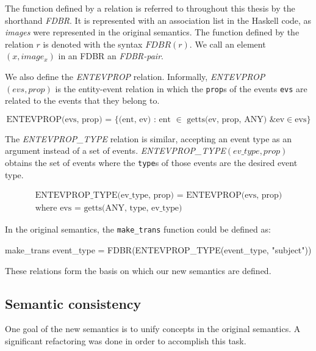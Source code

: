 \documentclass[../main.tex]{subfiles}
\begin{document}
The function defined by a relation is referred to throughout this thesis by the shorthand {\em FDBR}.  It is represented with an association list in the Haskell code,
as {\em images} were represented in the original semantics.  The function defined by the relation $r$ is denoted with the syntax $FDBR(r)$.
We call an element $(x, image_x)$ in an FDBR an {\em FDBR-pair}.

We also define the {\em ENTEVPROP} relation.  Informally, {\em ENTEVPROP}$(evs, prop)$ is the entity-event relation in which the \texttt{prop}s of the events \texttt{evs} are related to the events that they belong to.

\begin{definition}
	\[\text{ENTEVPROP(evs, prop) = }\{\text{(ent, ev) : ent } \in \text{ getts(ev, prop, ANY) \& ev} \in \text{evs} \}\]
\end{definition}

The {\em ENTEVPROP\_TYPE} relation is similar, accepting an event type as an argument instead of a set of events.
{\em ENTEVPROP\_TYPE}$(ev\_type, prop)$ obtains the set of events where the \texttt{type}s of those events are the desired event type.


\begin{definition}
	\begin{multline}
	\text{ENTEVPROP\_TYPE(ev\_type, prop) = ENTEVPROP(evs, prop)} \\ \text{where evs = getts(ANY, type, ev\_type)}
	\end{multline}
\end{definition}

In the original semantics, the \texttt{make\_trans} function could be defined as:

\begin{code}
	make_trans event_type = FDBR(ENTEVPROP_TYPE(event_type, "subject"))
\end{code}

These relations form the basis on which our new semantics are defined.


\subsection{Semantic consistency}

One goal of the new semantics is to unify concepts in the original semantics.  A significant refactoring was done in order to 
accomplish this task.
\end{document}
